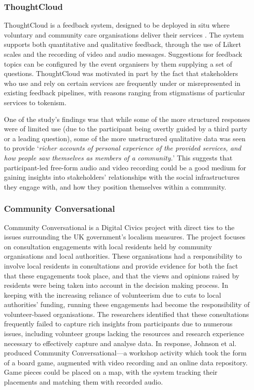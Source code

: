 \subsubsection{ThoughtCloud}

ThoughtCloud is a feedback system, designed to be deployed in situ where voluntary and community care organisations deliver their services \citep{Dow2016}. The system supports both quantitative and qualitative feedback, through the use of Likert scales and the recording of video and audio messages. Suggestions for feedback topics can be configured by the event organisers by them supplying a set of questions. ThoughtCloud was motivated in part by the fact that stakeholders who use and rely on certain services are frequently under or misrepresented in existing feedback pipelines, with reasons ranging from stigmatisms of particular services to tokenism.

One of the study's findings was that while some of the more structured responses were of limited use (due to the participant being overtly guided by a third party or a leading question), some of the more unstructured qualitative data was seen to provide `\textit{richer accounts of personal experience of the provided services, and how people saw themselves as members of a community.}' This suggests that participant-led free-form audio and video recording could be a good medium for gaining insights into stakeholders' relationships with the social infrastructures they engage with, and how they position themselves within a community.

\subsubsection{Community Conversational}

Community Conversational \citep{Johnson2017} is a Digital Civics project with direct ties to the issues surrounding the UK government's localism measures. The project focuses on consultation engagements with local residents held by community organisations and local authorities. These organisations had a responsibility to involve local residents in consultations and provide evidence for both the fact that these engagements took place, and that the views and opinions raised by residents were being taken into account in the decision making process. In keeping with the increasing reliance of volunteerism due to cuts to local authorities' funding, running these engagements had become the responsibility of volunteer-based organisations. The researchers identified that these consultations frequently failed to capture rich insights from participants due to numerous issues, including volunteer groups lacking the resources and research experience necessary to effectively capture and analyse data. In response, Johnson et al. produced Community Conversational---a workshop activity which took the form of a board game, augmented with video recording and an online data repository. Game pieces could be placed on a map, with the system tracking their placements and matching them with recorded audio.

